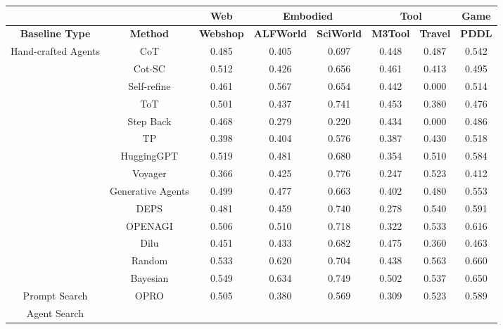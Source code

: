 \setlength{\tabcolsep}{0.5mm} 
\begin{table}[t!]
    \centering
    \begin{tabular}{cccccccc}
    \hline
    & & \textbf{Web} & \multicolumn{2}{c}{\textbf{Embodied}} & \multicolumn{2}{c}{\textbf{Tool}} & \textbf{Game} \\ 
    \hline
    \textbf{Baseline Type} & \textbf{Method} & \multicolumn{1}{c}{\textbf{Webshop}} & \multicolumn{1}{c}{\textbf{ALFWorld}} & \multicolumn{1}{c}{\textbf{SciWorld}} & \multicolumn{1}{c}{\textbf{M3Tool}} & \multicolumn{1}{c}{\textbf{Travel}} & \multicolumn{1}{c}{\textbf{PDDL}}\\
    \hline
    \multirow{13}{*}{Hand-crafted Agents} 
        & CoT & 0.485 & 0.405 & 0.697 & 0.448  & 0.487 & 0.542\\ 
        & Cot-SC & 0.512 & 0.426 & 0.656 & 0.461  & 0.413 & 0.495\\ 
        & Self-refine & 0.461 & 0.567 & 0.654 & 0.442  & 0.000 & 0.514\\ 
        & ToT & 0.501 & 0.437 & 0.741 & 0.453  & 0.380 & 0.476\\ 
        & Step Back & 0.468 & 0.279 & 0.220 & 0.434  & 0.000 & 0.486\\ 
        & TP & 0.398 & 0.404 & 0.576 & 0.387  & 0.430 & 0.518\\ 
        & HuggingGPT & 0.519 & 0.481 & 0.680 & 0.354  & 0.510 & 0.584\\ 
        & Voyager & 0.366 & 0.425 & 0.776 & 0.247  & 0.523 & 0.412\\ 
        & Generative Agents & 0.499 & 0.477 & 0.663 & 0.402  & 0.480 & 0.553\\ 
        & DEPS & 0.481 & 0.459 & 0.740 & 0.278  & 0.540 & 0.591\\ 
        & OPENAGI & 0.506 & 0.510 & 0.718 & 0.322  & 0.533 & 0.616\\ 
        & Dilu & 0.451 & 0.433 & 0.682 & 0.475  & 0.360 & 0.463\\ 
    \hline
    \multirow{2}{*}{Module Search} 
        & Random  & 0.533 & 0.620 & 0.704& 0.438 & 0.563&0.660 \\
        & Bayesian & 0.549 & 0.634 & 0.749& 0.502 & 0.537& 0.650\\
    \hline
    \multirow{1}{*}{Prompt Search} 
        & OPRO & 0.505 & 0.380 & 0.569& 0.309 & 0.523& 0.589\\
    \hline
    \multirow{1}{*}{Agent Search} 

\end{tabular}
\end{table}

